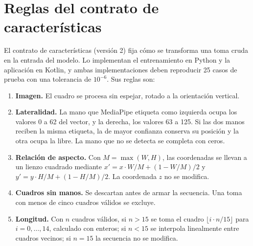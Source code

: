 
\chapter{Reglas del contrato de características}
\label{ap:contrato}

El contrato de características (versión 2) fija cómo se transforma una toma cruda en la entrada del modelo. Lo implementan el entrenamiento en Python y la aplicación en Kotlin, y ambas implementaciones deben reproducir 25 casos de prueba con una tolerancia de $10^{-6}$. Sus reglas son:

\begin{enumerate}
    \item \textbf{Imagen.} El cuadro se procesa sin espejar, rotado a la orientación vertical.
    \item \textbf{Lateralidad.} La mano que MediaPipe etiqueta como izquierda ocupa los valores 0 a 62 del vector, y la derecha, los valores 63 a 125. Si las dos manos reciben la misma etiqueta, la de mayor confianza conserva su posición y la otra ocupa la libre. La mano que no se detecta se completa con ceros.
    \item \textbf{Relación de aspecto.} Con $M = \max(W, H)$, las coordenadas se llevan a un lienzo cuadrado mediante $x' = x \cdot W/M + (1 - W/M)/2$ y $y' = y \cdot H/M + (1 - H/M)/2$. La coordenada $z$ no se modifica.
    \item \textbf{Cuadros sin manos.} Se descartan antes de armar la secuencia. Una toma con menos de cinco cuadros válidos se excluye.
    \item \textbf{Longitud.} Con $n$ cuadros válidos, si $n > 15$ se toma el cuadro $\lfloor i \cdot n / 15 \rfloor$ para $i = 0, \ldots, 14$, calculado con enteros; si $n < 15$ se interpola linealmente entre cuadros vecinos; si $n = 15$ la secuencia no se modifica.
\end{enumerate}
